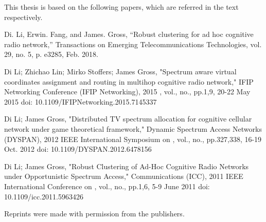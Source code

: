 This thesis is based on the following papers, which  are referred in the text respectively.

Di. Li, Erwin. Fang, and James. Gross, “Robust clustering for ad hoc cognitive radio network,” Transactions on Emerging Telecommunications Technologies, vol. 29, no. 5, p. e3285, Feb. 2018.

Di Li; Zhichao Lin; Mirko Stoffers; James Gross, "Spectrum aware virtual coordinates assignment and routing in multihop cognitive radio network," IFIP Networking Conference (IFIP Networking), 2015 , vol., no., pp.1,9, 20-22 May 2015
doi: 10.1109/IFIPNetworking.2015.7145337

Di Li; James Gross, "Distributed TV spectrum allocation for cognitive cellular network under game theoretical framework," Dynamic Spectrum Access Networks (DYSPAN), 2012 IEEE International Symposium on , vol., no., pp.327,338, 16-19 Oct. 2012
doi: 10.1109/DYSPAN.2012.6478156

Di Li; James Gross, "Robust Clustering of Ad-Hoc Cognitive Radio Networks under Opportunistic Spectrum Access," Communications (ICC), 2011 IEEE International Conference on , vol., no., pp.1,6, 5-9 June 2011
doi: 10.1109/icc.2011.5963426

Reprints were made with permission from the publishers.